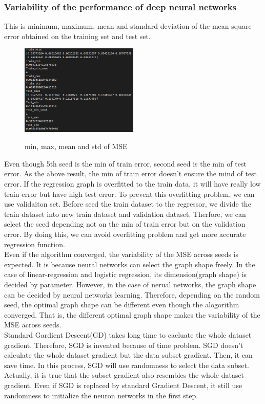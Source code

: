 \documentclass[a4paper]{article}
\begin{document}
\subsubsection{Variability of the performance of deep neural networks}
This is  minimum, maximum, mean and standard deviation of the mean square error obtained on the training set and test set. \\
\begin{figure}[h]
\includegraphics[width=0.5\textwidth]{ex_1_1_b.png}\\
\caption{min, max, mean and std of MSE}
\end{figure}
Even though 5th seed is the min of train error, second seed is the min of test error. As the above result, the min of train error doesn't ensure the mind of test error. If the regression graph is overfitted to the train data, it will have really low train error but have high test error. To prevent this overfitting problem, we can use validaiton set. Before seed the train dataset to the regressor, we divide the train dataset into new train dataset and validation dataset. Therfore, we can select the seed depending not on the min of train error but on the validation error. By doing this, we can avoid overfitting problem and get more accurate regression function.\\
Even if the algorithm converged, the variability of the MSE across seeds is expected. It is because neural networks can select the graph shape freely. In the case of linear-regression and logistic regression, its dimension(graph shape) is decided by parameter. However, in the case of nerual networks, the graph shape can be decided by neural networks learning. Therefore, depending on the random seed, the optimal graph shape can be different even though the alogorithm converged. That is, the different optimal graph shape makes the variability of the MSE across seeds.\\
Standard Gardient Descent(GD) takes long time to cacluate the whole dataset gradient. Therefore, SGD is invented because of time problem. SGD doesn't calculate the whole dataset gradient but the data subset gradient. Then, it can save time. In this process, SGD will use randomness to select the data subset. Actually, it is true that the subset gradient also resembles the whole dataset gradient. Even if SGD is replaced by standard Gradient Descent, it still use randomness to initialize the neuron networks in the first step.\\
\clearpage
\end{document}
